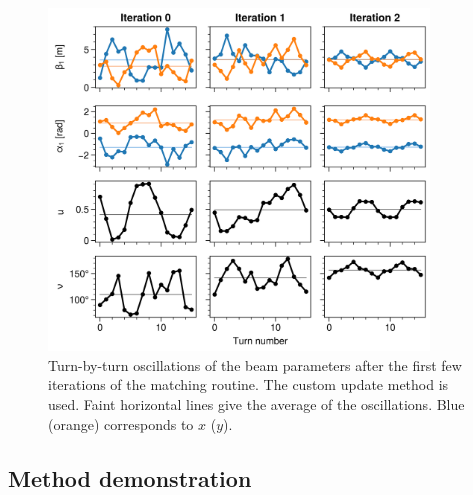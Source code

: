 \begin{figure}[!p]
    \centering
    \includegraphics[width=0.9\textwidth]{Images/chapter2/optimizer_iters.png}
    \caption{Turn-by-turn oscillations of the beam parameters after the first few iterations of the matching routine. The custom update method is used. Faint horizontal lines give the average of the oscillations. Blue (orange) corresponds to $x$ ($y$).}
    \label{fig:optimizer_iters}
\end{figure}








\subsection{Method demonstration}

